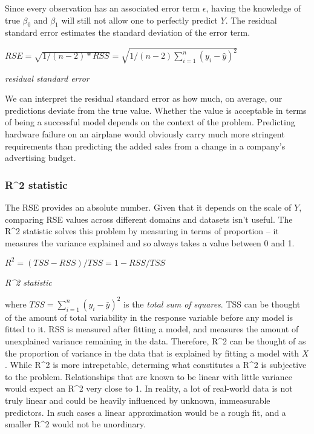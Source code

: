 \documentclass[]{book}
\begin{document}
Since every observation has an associated error term \(\epsilon\), having the knowledge of true \(\beta_0\) and \(\beta_1\) will still not allow one to perfectly predict \(Y\). The residual standard error estimates the standard deviation of the error term.

\(RSE = \sqrt{1/(n-2)*RSS} = \sqrt{1/(n-2)\sum_{i=1}^{n}(y_i - \hat y)^2}\)

\emph{residual standard error}

We can interpret the residual standard error as how much, on average, our predictions deviate from the true value. Whether the value is acceptable in terms of being a successful model depends on the context of the problem. Predicting hardware failure on an airplane would obviously carry much more stringent requirements than predicting the added sales from a change in a company's advertising budget.

\hypertarget{r2-statistic}{%
\subsubsection{R\^{}2 statistic}\label{r2-statistic}}

The RSE provides an absolute number. Given that it depends on the scale of \(Y\), comparing RSE values across different domains and datasets isn't useful. The R\^{}2 statistic solves this problem by measuring in terms of proportion -- it measures the variance explained and so always takes a value between 0 and 1.

\(R^2 = (TSS - RSS)/TSS = 1 - RSS/TSS\)

\emph{R\^{}2 statistic}

where \(TSS = \sum_{i=1}^{n}(y_i-\bar y)^2\) is the \emph{total sum of squares}. TSS can be thought of the amount of total variability in the response variable before any model is fitted to it. RSS is measured after fitting a model, and measures the amount of unexplained variance remaining in the data. Therefore, R\^{}2 can be thought of as the proportion of variance in the data that is explained by fitting a model with \(X\). While R\^{}2 is more intrepetable, determing what constitutes a R\^{}2 is subjective to the problem. Relationships that are known to be linear with little variance would expect an R\^{}2 very close to 1. In reality, a lot of real-world data is not truly linear and could be heavily influenced by unknown, immeasurable predictors. In such cases a linear approximation would be a rough fit, and a smaller R\^{}2 would not be unordinary.
\end{document}
